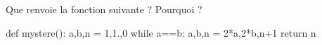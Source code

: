 \question{} Que renvoie la fonction suivante ? Pourquoi ? 
\begin{pyverbatim}
def mystere():
    a,b,n = 1,1.,0
    while a==b:
        a,b,n = 2*a,2*b,n+1
    return n
\end{pyverbatim}

